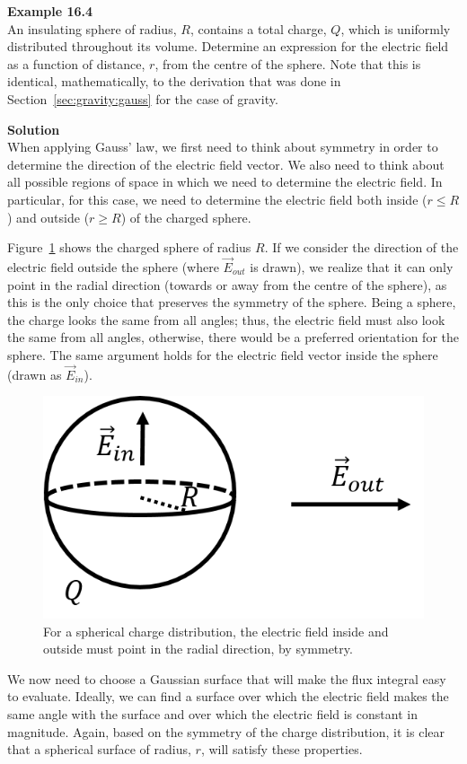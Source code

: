 \begin{framed}
\textbf{Example 16.4}\\
An insulating sphere of radius, $R$, contains a total charge, $Q$, which is uniformly distributed throughout its volume. Determine an expression for the electric field as a function of distance, $r$, from the centre of the sphere.
Note that this is identical, mathematically, to the derivation that was done in Section~\ref{sec:gravity:gauss} for the case of gravity.

\begin{framed}
\textbf{Solution}\\
When applying Gauss' law,  we first need to think about symmetry in order to determine the direction of the electric field vector. We also need to think about all possible regions of space in which we need to determine the electric field. In particular, for this case, we need to determine the electric field both inside ($r\leq R$) and outside ($r\geq R$) of the charged sphere.

Figure~\ref{fig:gauss:spheresymmetry} shows the charged sphere of radius $R$. If we consider the direction of the electric field outside the sphere (where $\vec E_{out}$ is drawn), we realize that it can only point in the radial direction (towards or away from the centre of the sphere), as this is the only choice that preserves the symmetry of the sphere. Being a sphere, the charge looks the same from all angles; thus, the electric field must also look the same from all angles, otherwise, there would be a preferred orientation for the sphere. The same argument holds for the electric field vector inside the sphere (drawn as $\vec E_{in}$).

\begin{figure}[!htbp]
\centering
\includegraphics[width=0.4\linewidth]{files/spheresymmetry-cfcd411403bc4dc5e77a998a9afcd219.png}
\caption[]{For a spherical charge distribution, the electric field inside and outside must point in the radial direction, by symmetry.}
\label{fig:gauss:spheresymmetry}
\end{figure}

We now need to choose a Gaussian surface that will make the flux integral easy to evaluate. Ideally, we can find a surface over which the electric field makes the same angle with the surface and over which the electric field is constant in magnitude. Again, based on the symmetry of the charge distribution, it is clear that a spherical surface of radius, $r$, will satisfy these properties.


\end{framed}
\end{framed}
